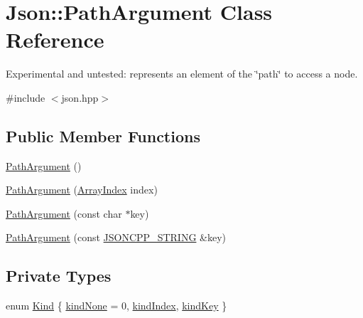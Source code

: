 \hypertarget{classJson_1_1PathArgument}{}\section{Json\+:\+:Path\+Argument Class Reference}
\label{classJson_1_1PathArgument}


Experimental and untested\+: represents an element of the \char`\"{}path\char`\"{} to access a node.  




{\ttfamily \#include $<$json.\+hpp$>$}

\subsection*{Public Member Functions}
\begin{DoxyCompactItemize}
\item 
\hyperlink{classJson_1_1PathArgument_a3c96ed20c56a55eb76d37a11553c528e}{Path\+Argument} ()
\item 
\hyperlink{classJson_1_1PathArgument_a53c5b27143b161301b95fd544c139ecf}{Path\+Argument} (\hyperlink{namespaceJson_a8048e741f2177c3b5d9ede4a5b8c53c2}{Array\+Index} index)
\item 
\hyperlink{classJson_1_1PathArgument_a9690417a8a40e6e49f2acdf6c9281345}{Path\+Argument} (const char $\ast$key)
\item 
\hyperlink{classJson_1_1PathArgument_ac15f25452124fbf21218897113015301}{Path\+Argument} (const \hyperlink{json_8hpp_a1e723f95759de062585bc4a8fd3fa4be}{J\+S\+O\+N\+C\+P\+P\+\_\+\+S\+T\+R\+I\+NG} \&key)
\end{DoxyCompactItemize}
\subsection*{Private Types}
\begin{DoxyCompactItemize}
\item 
enum \hyperlink{classJson_1_1PathArgument_a2420bbad778573c147e578701b84d9b9}{Kind} \{ \hyperlink{classJson_1_1PathArgument_a2420bbad778573c147e578701b84d9b9afa8c7a261ccb8ae5171d2372321c2698}{kind\+None} = 0, 
\hyperlink{classJson_1_1PathArgument_a2420bbad778573c147e578701b84d9b9ae5a976b898111903334cb131f5e03dc4}{kind\+Index}, 
\hyperlink{classJson_1_1PathArgument_a2420bbad778573c147e578701b84d9b9a74f5968d06c01701b7a46092c33ba7d1}{kind\+Key}
 \}
\end{DoxyCompactItemize}
